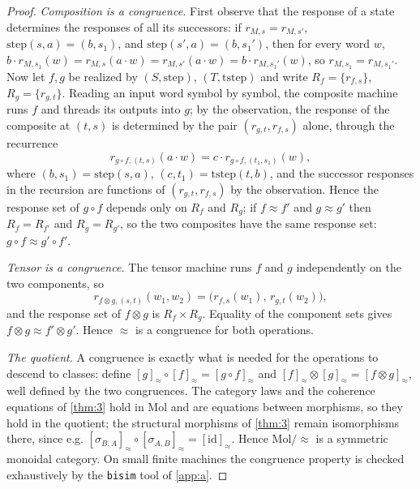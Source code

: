 \begin{proof}
\emph{Composition is a congruence.} First observe that the response of a
state determines the responses of all its successors: if
$r_{M,s} = r_{M,s'}$, $\mathrm{step} (s, a) = (b, s_1)$, and
$\mathrm{step} (s', a) = (b, s_1')$, then for every word $w$,
$b \cdot r_{M,s_1} (w) = r_{M,s} (a \cdot w) = r_{M,s'} (a \cdot w) =
b \cdot r_{M,s_1'} (w)$, so $r_{M,s_1} = r_{M,s_1'}$. Now let $f, g$ be
realized by $(S, \mathrm{step})$, $(T, \mathrm{tstep})$ and write
$R_f = \{ r_{f,s} \}$, $R_g = \{ r_{g,t} \}$. Reading an input word symbol by
symbol, the composite machine runs $f$ and threads its outputs into $g$; by
the observation, the response of the composite at $(t, s)$ is determined by
the pair $(r_{g,t}, r_{f,s})$ alone, through the recurrence
\[ r_{g \circ f, (t,s)} (a \cdot w)
   = c \cdot r_{g \circ f, (t_1, s_1)} (w) , \]
where $(b, s_1) = \mathrm{step} (s, a)$, $(c, t_1) = \mathrm{tstep} (t, b)$,
and the successor responses in the recursion are functions of
$(r_{g,t}, r_{f,s})$ by the observation. Hence the response set of $g \circ f$
depends only on $R_f$ and $R_g$; if $f \approx f'$ and $g \approx g'$ then
$R_f = R_{f'}$ and $R_g = R_{g'}$, so the two composites have the same
response set: $g \circ f \approx g' \circ f'$.

\emph{Tensor is a congruence.} The tensor machine runs $f$ and $g$
independently on the two components, so
\[ r_{f \otimes g, (s,t)} (w_1, w_2) = \bigl (r_{f,s} (w_1),\, r_{g,t} (w_2)\bigr) , \]
and the response set of $f \otimes g$ is $R_f \times R_g$. Equality of the
component sets gives $f \otimes g \approx f' \otimes g'$. Hence $\approx$ is
a congruence for both operations.

\emph{The quotient.} A congruence is exactly what is needed for the
operations to descend to classes: define
$[g]_{\approx} \circ [f]_{\approx} = [g \circ f]_{\approx}$ and
$[f]_{\approx} \otimes [g]_{\approx} = [f \otimes g]_{\approx}$, well defined
by the two congruences. The category laws and the coherence equations of
\autoref{thm:3} hold in Mol and are equations between morphisms, so they hold
in the quotient; the structural morphisms of \autoref{thm:3} remain
isomorphisms there, since e.g.
$[\sigma_{B,A}]_{\approx} \circ [\sigma_{A,B}]_{\approx} =
[\mathrm{id}]_{\approx}$. Hence $\mathrm{Mol}/{\approx}$ is a symmetric
monoidal category. On small finite machines the congruence property is
checked exhaustively by the \texttt{bisim} tool of \autoref{app:a}.
\end{proof}

